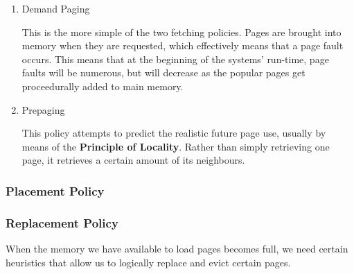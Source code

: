 \documentclass[11pt]{article}
\begin{document}
\begin{enumerate}
\item Demand Paging
\label{sec:orgheadline39}

This is the more simple of the two fetching policies.
Pages are brought into memory when they are requested,
which effectively means that a page fault occurs. This
means that at the beginning of the systems' run-time,
page faults will be numerous, but will decrease as the
popular pages get proceedurally added to main memory.

\item Prepaging
\label{sec:orgheadline40}

This policy attempts to predict the realistic future page
use, usually by means of the \textbf{Principle of Locality}. Rather
than simply retrieving one page, it retrieves a certain
amount of its neighbours.
\end{enumerate}

\subsubsection{Placement Policy}
\label{sec:orgheadline42}



\subsubsection{Replacement Policy}
\label{sec:orgheadline50}

When the memory we have available to load pages becomes full,
we need certain heuristics that allow us to logically replace
and evict certain pages.
\end{document}
